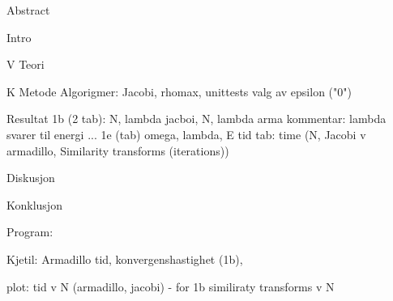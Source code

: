 

		Abstract

		Intro
		
V		Teori
						
			
K		Metode
			Algorigmer: Jacobi, rhomax, unittests
			valg av epsilon ("0")
			
		Resultat
			1b (2 tab): N, lambda jacboi,
							  N, lambda arma
					kommentar: lambda svarer til energi ... 
			1e	 (tab) omega, lambda, E
			tid
			tab: time (N, Jacobi v armadillo, 			Similarity transforms (iterations))

		Diskusjon

			
		Konklusjon
		
		

Program:

	Kjetil: Armadillo tid, konvergenshastighet (1b),
	
	plot: tid v N (armadillo, jacobi) - for 1b
	similiraty transforms v N
	
	